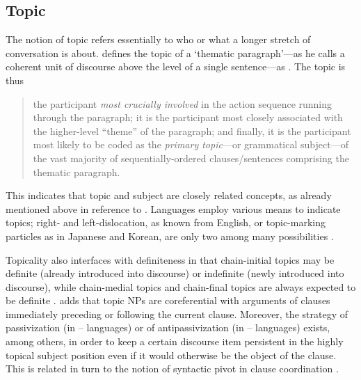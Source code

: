 
\subsection{Topic}
\label{subsec:topic}

The notion of topic refers essentially to who or what a longer stretch of
conversation is about. \citet{givon1983} defines the topic of a `thematic
paragraph'---as he calls a coherent unit of discourse above the level of a
single sentence---as . The topic is thus

\blockcquote[8]{givon1983}{the participant \emph{most crucially involved} in
the action sequence running through the paragraph; it is the participant most
closely associated with the higher-level \enquote{theme} of the paragraph; and
finally, it is the participant most likely to be coded as the \emph{primary
topic}---or grammatical subject---of the vast majority of sequentially-ordered
clauses/sentences comprising the thematic paragraph.}

This indicates that topic and subject are closely related concepts, as already
mentioned above in reference to \citet{comrie1989}. Languages employ various
means to indicate topics; right- and left-dislocation, as known from English,
or topic-marking particles as in Japanese and Korean, are only two among many
possibilities \citep[174]{dixon2010a}.

Topicality also interfaces with definiteness in that chain-initial topics may
be definite (already introduced into discourse) or indefinite (newly introduced
into discourse), while chain-medial topics and chain-final topics are always
expected to be definite \citep[10]{givon1983}. \citet[171]{dixon2010a} adds
that topic NPs are coreferential with arguments of clauses immediately
preceding or following the current clause. Moreover, the strategy of
passivization (in \Nom{}--\Acc{} languages) or of antipassivization (in 
\Erg{}--\Abs{} languages) exists, among others, in order to keep a certain
discourse item persistent in the highly topical subject position even if it
would otherwise be the object of the clause. This is related in turn to the
notion of syntactic pivot in clause coordination \citep[172]{dixon2010a}.


